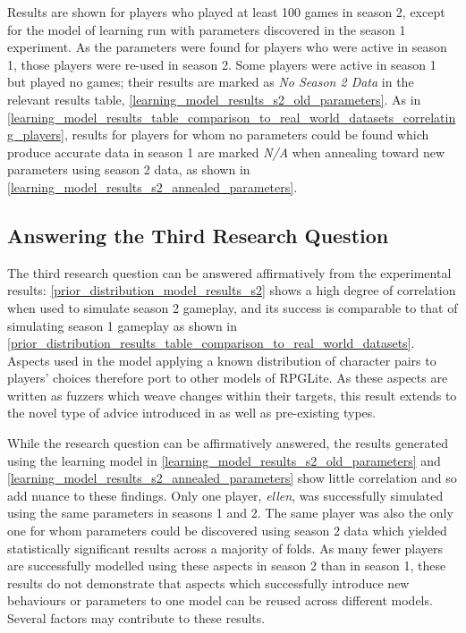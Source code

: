Results are shown for players who played at least 100 games in season 2, except
for the model of learning run with parameters discovered in the season 1
experiment. As the parameters were found for players who were active in season
1, those players were re-used in season 2. Some players were active in season 1
but played no games; their results are marked as \emph{No Season 2 Data} in the relevant
results table, \cref{learning_model_results_s2_old_parameters}. As in
\cref{learning_model_results_table_comparison_to_real_world_datasets_correlating_players},
results for players for whom no parameters could be found which produce accurate data in
season 1 are marked \emph{N/A} when annealing toward new parameters using season
2 data, as shown in \cref{learning_model_results_s2_annealed_parameters}.




\subsection{Answering the Third Research Question}

The third research question can be answered affirmatively from the experimental
results: \cref{prior_distribution_model_results_s2} shows a high degree of
correlation when used to simulate season 2 gameplay, and its success is
comparable to that of simulating season 1 gameplay as shown in
\cref{prior_distribution_results_table_comparison_to_real_world_datasets}.
Aspects used in the model applying a known distribution of character pairs to
players' choices therefore port to other models of RPGLite. As these aspects are
written as fuzzers which weave changes within their targets, this result extends
to the novel type of advice introduced in \pdsfthree{} as well as pre-existing types.

While the research question can be affirmatively answered, the results generated
using the learning model in \cref{learning_model_results_s2_old_parameters} and
\cref{learning_model_results_s2_annealed_parameters} show little correlation and
so add nuance to these findings. Only one player, \emph{ellen}, was successfully
simulated using the same parameters in seasons 1 and 2. The same player was also
the only one for whom parameters could be discovered using season 2 data which
yielded statistically significant results across a majority of folds. As many
fewer players are successfully modelled using these aspects in season 2 than in
season 1, these results do not demonstrate that aspects which successfully
introduce new behaviours or parameters to one model can be reused across
different models. Several factors may contribute to these results.

